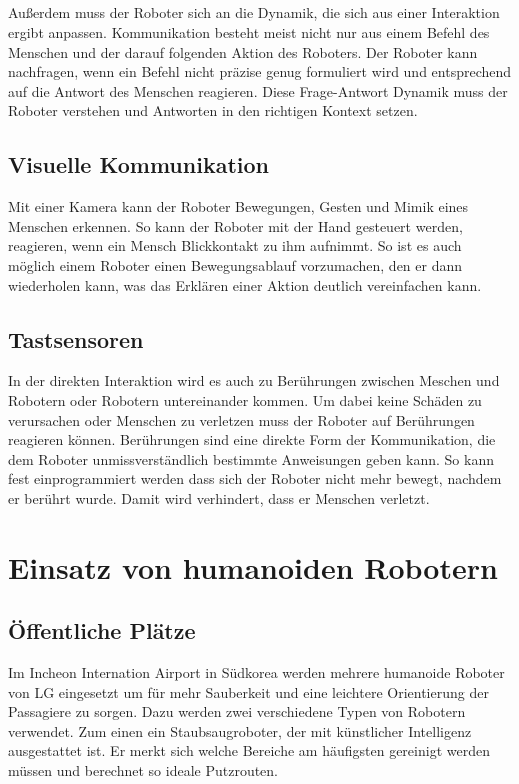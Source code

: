 \subparagraph{}
Außerdem muss der Roboter sich an die Dynamik, die sich aus einer Interaktion
ergibt anpassen. Kommunikation besteht meist nicht nur aus einem Befehl des
Menschen und der darauf folgenden Aktion des Roboters. Der Roboter kann
nachfragen, wenn ein Befehl nicht präzise genug formuliert wird und entsprechend
auf die Antwort des Menschen reagieren. Diese Frage-Antwort Dynamik muss der
Roboter verstehen und Antworten in den richtigen Kontext setzen.

\subsection{Visuelle Kommunikation}
Mit einer Kamera kann der Roboter Bewegungen, Gesten und Mimik eines Menschen
erkennen. So kann der Roboter mit der Hand gesteuert werden, reagieren, wenn ein
Mensch Blickkontakt zu ihm aufnimmt. So ist es auch möglich einem Roboter einen
Bewegungsablauf vorzumachen, den er dann wiederholen kann, was das Erklären
einer Aktion deutlich vereinfachen kann.

\subsection{Tastsensoren}
In der direkten Interaktion wird es auch zu
Berührungen zwischen Meschen und Robotern oder Robotern untereinander kommen. Um
dabei keine Schäden zu verursachen oder Menschen zu verletzen muss der Roboter
auf Berührungen reagieren können. Berührungen sind eine direkte Form der
Kommunikation, die dem Roboter unmissverständlich bestimmte Anweisungen geben
kann. So kann fest einprogrammiert werden dass sich der Roboter nicht mehr
bewegt, nachdem er berührt wurde. Damit wird verhindert, dass er Menschen
verletzt. \cite{Prassler2004}

\section{Einsatz von humanoiden Robotern}\label{sec:einsatz}
\subsection{Öffentliche Plätze}\label{sec:oeffentliche-plaetze}
Im Incheon Internation Airport in Südkorea werden mehrere humanoide Roboter von
LG eingesetzt um für mehr Sauberkeit und eine leichtere Orientierung der
Passagiere zu sorgen. Dazu werden zwei verschiedene Typen von Robotern
verwendet. Zum einen ein Staubsaugroboter, der mit künstlicher Intelligenz
ausgestattet ist. Er merkt sich welche Bereiche am häufigsten gereinigt werden
müssen und berechnet so ideale Putzrouten.


